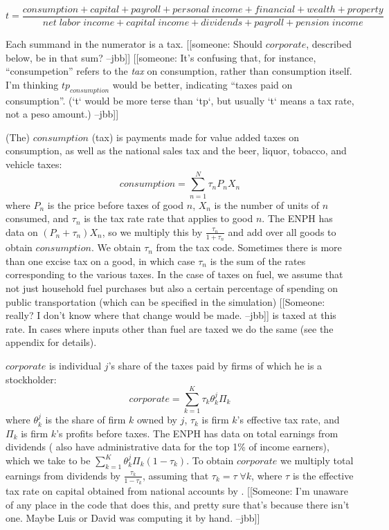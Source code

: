 \documentclass[12pt]{article}
\begin{document}
\begin{equation}
  t=\frac
  {consumption + capital + payroll + personal\ income + financial + wealth + property}
  {net \; labor \;income +capital \;income + dividends + payroll + pension \;income}
\end{equation}

Each summand in the numerator is a tax.
[[someone:
    Should $corporate$, described below, be in that sum?
    --jbb]]
[[someone:
    It's confusing that, for instance,
    ``consumpetion'' refers to the \textit{tax} on consumption,
    rather than consumption itself.
    I'm thinking $tp_{consumption}$ would be better,
    indicating ``taxes paid on consumption''.
    (`t` would be more terse than `tp`,
    but usually `t` means a tax rate, not a peso amount.)
    --jbb]]

(The) $consumption$ (tax) is payments made for value added taxes on consumption,
as well as the national sales tax
and the beer, liquor, tobacco, and vehicle taxes:
\begin{equation}
consumption = \sum^{N}_{n=1} \tau_nP_nX_n
\end{equation}
where $P_n$ is the price before taxes of good $n$,
$X_n$ is the number of units of $n$ consumed,
and $\tau_n$ is the tax rate rate that applies to good $n$.
The ENPH has data on $(P_n+\tau_n)X_n$,
so we multiply this by $\frac{\tau_n}{1+\tau_n}$
and add over all goods to obtain $consumption$.
We obtain $\tau_n$ from the tax code.
Sometimes there is more than one excise tax on a good,
in which case $\tau_n$ is the sum of
the rates corresponding to the various taxes.
In the case of taxes on fuel,
we assume that not just household fuel purchases but also
a certain percentage of spending on public transportation
(which can be specified in the simulation)
[[Someone:
    really? I don't know where that change would be made.
    --jbb]]
is taxed at this rate.
In cases where inputs other than fuel are taxed we do the same
(see the appendix for details).

$corporate$ is individual $j$'s share of
the taxes paid by firms of which he is a stockholder:
\begin{equation}
corporate = \sum^{K}_{k=1} \tau_k\theta^j_k\Pi_k
\end{equation}
where $\theta^j_k$ is the share of firm $k$ owned by $j$,
$\tau_k$ is firm $k$'s effective tax rate,
and $\Pi_k$ is firm $k$'s profits before taxes.
The ENPH has data on total earnings from dividends
(\citet{juliana} also have administrative data for the top 1\% of income earners),
which we take to be $\sum^{K}_{k=1} \theta^j_k\Pi_k(1-\tau_k)$.
To obtain $corporate$ we multiply total earnings from dividends by
$\frac{\tau_k}{1-\tau_k}$,
assuming that $\tau_k=\tau \; \forall k$,
where $\tau$ is the effective tax rate on capital
obtained from national accounts by \citet{banrep}.
[[Someone:
    I'm unaware of any place in the code that does this,
    and pretty sure that's because there isn't one.
    Maybe Luis or David was computing it by hand.
    --jbb]]
\end{document}
